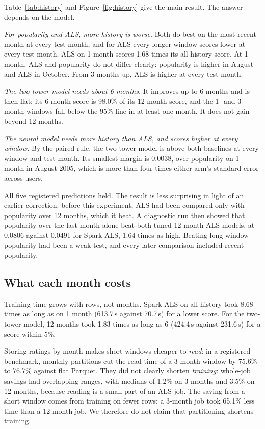 \documentclass[11pt]{article}
\begin{document}
Table~\ref{tab:history} and Figure~\ref{fig:history} give the main result. The answer depends on
the model.

\emph{For popularity and ALS, more history is worse.} Both do best on the most recent month at
every test month, and for ALS every longer window scores lower at every test month. ALS on 1 month scores 1.68 times its
all-history score. At 1 month, ALS and popularity do not differ clearly: popularity is higher in
August and ALS in October. From 3 months up, ALS is higher at every test month.

\emph{The two-tower model needs about 6 months.} It improves up to 6 months and is then flat: its
6-month score is 98.0\% of its 12-month score, and the 1- and 3-month windows fall below the 95\%
line in at least one month. It does not gain beyond 12 months.

\emph{The neural model needs more history than ALS, and scores higher at every window.} By the
paired rule, the two-tower model is above both baselines at every window and test month. Its
smallest margin is 0.0038, over popularity on 1 month in August 2005, which is more than four
times either arm's standard error across users.

All five registered predictions held. The result is less surprising in light of an earlier
correction: before this experiment, ALS had been compared only with popularity over 12 months,
which it beat. A diagnostic run then showed that popularity over the last month alone beat both
tuned 12-month ALS models, at 0.0806 against 0.0491 for Spark ALS, 1.64 times as high. Beating
long-window popularity had been a weak test, and every later comparison included recent
popularity.

\subsection{What each month costs}

Training time grows with rows, not months. Spark ALS on all history took 8.68 times as long as
on 1 month (613.7\,s against 70.7\,s) for a lower score. For the two-tower model, 12 months took
1.83 times as long as 6 (424.4\,s against 231.6\,s) for a score within 5\%.

Storing ratings by month makes short windows cheaper to \emph{read}: in a registered benchmark,
monthly partitions cut the read time of a 3-month window by 75.6\% to 76.7\% against flat
Parquet. They did not clearly shorten \emph{training}: whole-job savings had overlapping ranges,
with medians of 1.2\% on 3 months and 3.5\% on 12 months, because reading is a small part of an
ALS job. The saving from a short window comes from training on fewer rows: a 3-month job took
65.1\% less time than a 12-month job. We therefore do not claim that partitioning shortens
training.
\end{document}
